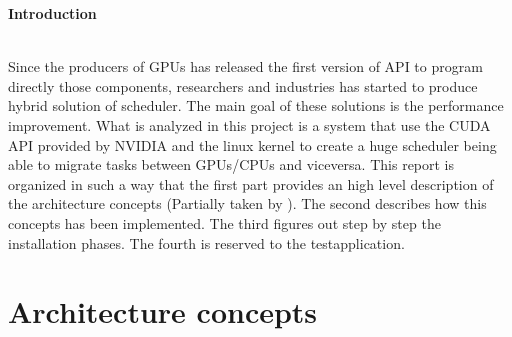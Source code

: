 \documentclass[a4paper,13pt]{article}
\newenvironment*{myabstract}{\begin{Large}\bf}{\end{Large}\\[2.5ex]}%
\begin{document}
\vspace{4ex}	%
\begin{multicols}{2}

\begin{myabstract} Introduction \end{myabstract}
Since the producers of GPUs has released the first version of API to program directly those 
components, researchers and industries has started to produce hybrid solution of scheduler. 
The main goal of these solutions is the performance improvement. What is analyzed in this project is 
a system that use the CUDA API\cite{cuda} provided by NVIDIA and the linux kernel to create a huge scheduler
being able to migrate tasks between GPUs/CPUs and viceversa. This report is organized in such a way
that the first part provides an high level description of the architecture concepts (Partially taken by \cite{paper_hetsched}). The 
second describes how this concepts has been implemented. The third figures out step by step
the installation phases. The fourth is reserved to the testapplication.




\section{Architecture concepts} 


\end{multicols}
\end{document}
